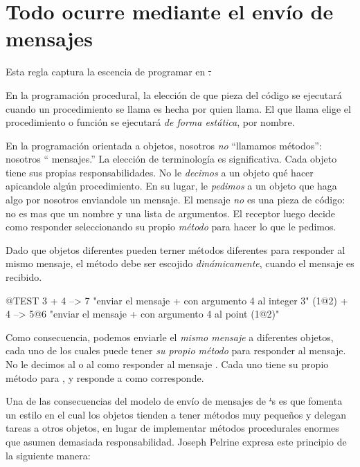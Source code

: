 \documentclass[a4paper,10pt,twoside]{book}
\begin{document}
\section{Todo ocurre mediante el env\'io de mensajes}


Esta regla captura la escencia de programar en \st.

En la programaci\'on procedural, la elecci\'on de que pieza del c\'odigo se ejecutar\'a cuando un procedimiento se llama es hecha por quien llama.
El que llama elige el procedimiento o funci\'on se ejecutar\'a \emph{de forma est\'atica}, por nombre.  

En la programaci\'on orientada a objetos, nosotros \emph{no} ``llamamos m\'etodos'': nosotros `` mensajes.''
La elecci\'on de terminolog\'ia es significativa.
Cada objeto tiene sus propias responsabilidades.
No le \emph{decimos} a un objeto qu\'e hacer apicandole alg\'un procedimiento.
En su lugar, le \emph{pedimos} a un objeto que haga algo por nosotros enviandole un mensaje.
El mensaje \emph{no} es una pieza de c\'odigo: no es mas que un nombre y una lista de argumentos.
El receptor luego decide como responder seleccionando su propio \emph{m\'etodo} para hacer lo que le pedimos.

Dado que objetos diferentes pueden terner m\'etodos diferentes para responder al mismo mensaje, el m\'etodo debe ser escojido \emph{din\'amicamente}, cuando el mensaje es recibido.
\begin{code}{@TEST}
3 + 4         --> 7          "enviar el mensaje + con argumento 4 al integer  3"
(1@2) + 4 --> 5@6    "enviar el mensaje + con argumento 4 al point (1@2)"
\end{code}
\noindent
Como consecuencia, podemos enviarle el \emph{mismo mensaje} a diferentes objetos, cada uno de los cuales puede tener \emph{su propio m\'etodo} para responder al mensaje.
No le decimos al   o al   como responder al mensaje .
Cada uno tiene su propio m\'etodo para \ct{+}, y responde a  como corresponde.

Una de las consecuencias del modelo de env\'io de mensajes de \st's es que fomenta un estilo en el cual los objetos tienden a tener m\'etodos muy peque\~nos y delegan tareas a otros objetos, en lugar de implementar m\'etodos procedurales enormes que asumen demasiada responsabilidad.
Joseph Pelrine
expresa este principio de la siguiente manera:
\end{document}

